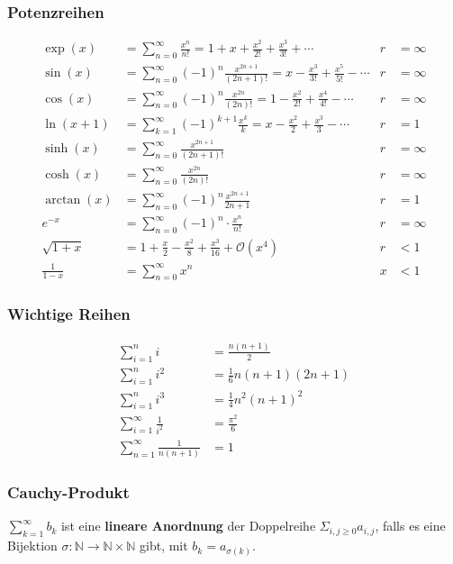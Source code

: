 \documentclass[a4paper,10pt]{article}
\def\sumk{\sum_{k=1}^\infty}
\def\sumn{\sum_{n=0}^\infty}
\begin{document}
\subsubsection{Potenzreihen}
\begin{align*}
\exp(x) &= \sumn \frac{x^n}{n!} = 1 + x + \frac{x^2}{2!} + \frac{x^3}{3!} + \cdots & r &= \infty \\
\sin(x) &= \sumn (-1)^n \frac{x^{2n + 1}}{(2n + 1)!} = x - \frac{x^3}{3!} + \frac{x^5}{5!} - \cdots & r &= \infty \\
\cos(x) &= \sumn (-1)^n \frac{x^{2n}}{(2n)!} = 1 - \frac{x^2}{2!} + \frac{x^4}{4!} - \cdots & r &= \infty \\
\ln(x + 1) &= \sumk (-1)^{k+1} \frac{x^k}{k} = x - \frac{x^2}{2} + \frac{x^3}{3} - \cdots & r &= 1 \\
\sinh(x) &= \sumn \frac{x^{2n+1}}{(2n+1)!} & r &= \infty \\
\cosh(x) &= \sumn \frac{x^{2n}}{(2n)!} & r &= \infty \\
\arctan(x) &= \sumn (-1)^n \frac{x^{2n+1}}{2n+1} & r &= 1 \\
e^{-x} &= \sumn (-1)^n \cdot \frac{x^n}{n!} & r &= \infty \\
\sqrt{1+x} &= 1 + \frac{x}{2} - \frac{x^2}{8} + \frac{x^3}{16} + \mathcal{O}(x^4) & r &< 1 \\
\frac{1}{1 - x} &= \sumn x^n & x &< 1
\end{align*}


\subsubsection{Wichtige Reihen}
\begin{align*}
 \sum_{i=1}^n i &= \frac{n(n+1)}{2} \\
 \sum_{i=1}^n i^2 &= \frac{1}{6}n(n+1)(2n+1) \\
 \sum_{i=1}^n i^3 &= \frac{1}{4}n^2(n+1)^2 \\
 \sum_{i=1}^\infty \frac{1}{i^2} &= \frac{\pi^2}{6} \\
 \sum_{n=1}^\infty \frac{1}{n(n+1)} &= 1
\end{align*}

\subsubsection{Cauchy-Produkt}
$\sumk b_k$ ist eine \textbf{lineare Anordnung} der Doppelreihe $\Sigma_{i,j \geq 0} a_{i,j}$, falls es eine Bijektion $\sigma : \mathbb{N} \rightarrow \mathbb{N} \times \mathbb{N}$ gibt, mit $b_k = a_{\sigma(k)}$.\\
\end{document}
